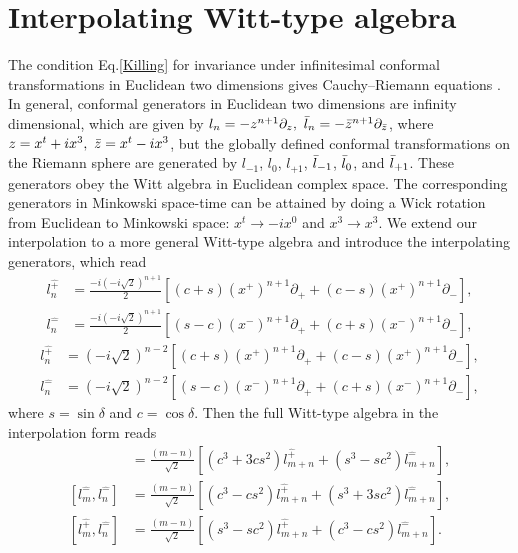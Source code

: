 \documentclass[%
 reprint,
superscriptaddress,
 amsmath,amssymb,
 aps,
]{revtex4-2}
\begin{document}
\section{Interpolating  Witt-type algebra}
\label{sec_Witt-type}
The condition Eq.\eqref{Killing} for invariance under infinitesimal conformal transformations in Euclidean two dimensions gives Cauchy–Riemann equations \cite{Francesco, Blumenhagen}. In general, conformal generators in Euclidean two dimensions are infinity dimensional, which are given by $l_n=-z^{n+1}\partial_{z},~\Bar{l}_n=-\Bar{z}^{n+1}\partial_{\Bar{z}}$, where $z=x^t+ix^3,~ \Bar{z}=x^t-ix^3$, but the globally defined conformal transformations on the Riemann sphere are generated by $l_{-1}$, $l_{0}$, $l_{+1}$, $\Bar{l}_{-1}$, $\Bar{l}_{0}$, and $\Bar{l}_{+1}$. These generators obey the Witt algebra in Euclidean complex space. The corresponding generators in Minkowski space-time can be attained by doing a Wick rotation from Euclidean to Minkowski space: $x^t\longrightarrow -ix^{0}$ and $x^3\longrightarrow x^{3}$. We extend our interpolation to a more general Witt-type algebra and introduce the interpolating generators, which read
\begin{align}
    l^{\hat{+}}_n&=\frac{-i(-i\sqrt{2})^{n+1}}{2}\left[(c+s)\left(x^{+}\right)^{n+1}\partial_{+}+(c-s)\left(x^{+}\right)^{n+1}\partial_{-}\right],\\
    l^{\hat{-}}_n&=\frac{-i(-i\sqrt{2})^{n+1}}{2}\left[(s-c)\left(x^{-}\right)^{n+1}\partial_{+}+(c+s)\left(x^{-}\right)^{n+1}\partial_{-}\right],
\end{align}  
\begin{align}
    l^{\hat{+}}_n&=(-i\sqrt{2})^{n-2}\left[(c+s)\left(x^{+}\right)^{n+1}\partial_{+}+(c-s)\left(x^{+}\right)^{n+1}\partial_{-}\right],\\
    l^{\hat{-}}_n&=(-i\sqrt{2})^{n-2}\left[(s-c)\left(x^{-}\right)^{n+1}\partial_{+}+(c+s)\left(x^{-}\right)^{n+1}\partial_{-}\right],
\end{align} 
where $s=\sin{\delta}$ and $c=\cos{\delta}$. Then the full Witt-type algebra in the interpolation form reads
\begin{align}
    [l^{\hat{+}}_m,l^{\hat{+}}_n]&=\frac{(m-n)}{\sqrt{2}}[(c^{3}+3cs^{2})l^{\hat{+}}_{m+n}+(s^{3}-sc^{2})l^{\hat{-}}_{m+n}],\\
    [l^{\hat{-}}_m,l^{\hat{-}}_n]&=\frac{(m-n)}{\sqrt{2}}[(c^{3}-cs^{2})l^{\hat{+}}_{m+n}+(s^{3}+3sc^{2})l^{\hat{-}}_{m+n}],\\
    [l^{\hat{+}}_m,l^{\hat{-}}_n]&=\frac{(m-n)}{\sqrt{2}}[(s^{3}-sc^{2})l^{\hat{+}}_{m+n}+(c^{3}-cs^{2})l^{\hat{-}}_{m+n}].
\end{align}
\end{document}
